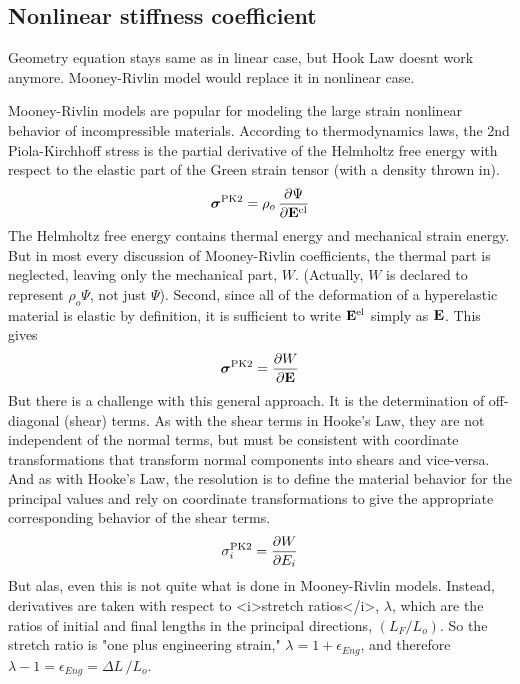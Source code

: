 \documentclass[12pt]{report}
\begin{document}
\subsection{Nonlinear stiffness coefficient}\par
Geometry equation stays same as in linear case, but Hook Law doesnt work anymore. Mooney-Rivlin model would 
replace it in nonlinear case.\par
Mooney-Rivlin models are popular for modeling the large strain nonlinear behavior of incompressible materials. 
According to thermodynamics laws, the 2nd Piola-Kirchhoff stress is the partial derivative of the 
Helmholtz free energy with respect to the elastic part of the Green strain tensor (with a density thrown in).
\[
\boldsymbol{\sigma}^\text{PK2} = \rho_o \, {\partial \Psi \over \partial {\bf E}^\text{el} }
\]
The Helmholtz free energy contains thermal energy and mechanical strain energy.  
But in most every discussion of Mooney-Rivlin coefficients, the thermal
part is neglected, leaving only the mechanical part, \(W\).  (Actually, \(W\)
is declared to represent \(\rho_o \Psi\), not just \(\Psi\)).  Second, since 
all of the deformation of a hyperelastic material is elastic by definition,
it is sufficient to write \({\bf E}^\text{el}\) simply as \({\bf E}\).
This gives
\[
\boldsymbol{\sigma}^\text{PK2} = {\partial W \over \partial {\bf E} }
\]
But there is a challenge with this general approach.  It is the determination
of off-diagonal (shear) terms.  As with the shear terms in Hooke's Law, they
are not independent of the normal terms, but must be consistent with coordinate
transformations that transform normal components into shears and vice-versa.
And as with Hooke's Law, the resolution is to define the material behavior
for the principal values and rely on coordinate transformations to give
the appropriate corresponding behavior of the shear terms.
\[
\sigma_i^\text{PK2} = {\partial W \over \partial E_i }
\]
But alas, even this is not quite what is done in Mooney-Rivlin models.  Instead, derivatives
are taken with respect to <i>stretch ratios</i>, \(\lambda\), which are 
the ratios of initial and final lengths in the principal directions, 
\((L_F / L_o)\).  So the stretch ratio is
"one plus engineering strain,"  \(\lambda = 1 + \epsilon_{Eng}\), and 
therefore \(\lambda - 1 = \epsilon_{Eng} = \Delta L \, / L_o\).
\end{document}
